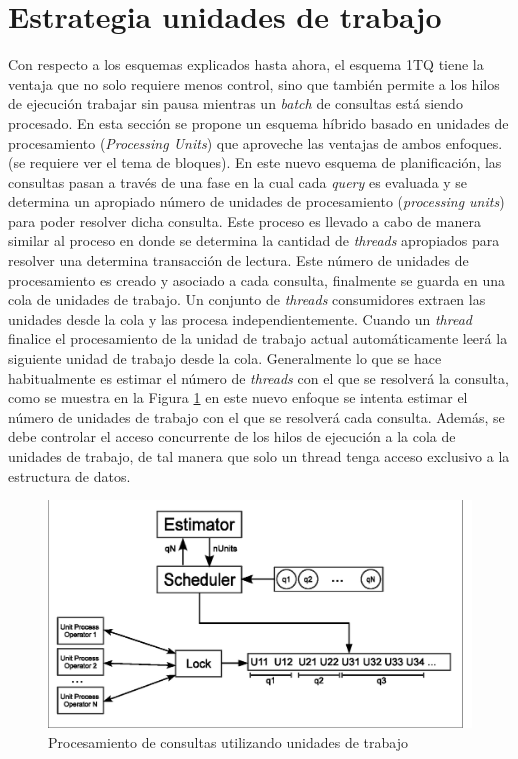 \section{Estrategia unidades de trabajo}
\label{scheduling:unidadestrabajo}
Con respecto a los esquemas explicados hasta ahora, el esquema 1TQ tiene la ventaja que no solo requiere menos control, sino que también permite a los hilos de ejecución trabajar sin pausa mientras un \textit{batch} de consultas está siendo procesado. En esta sección se propone un esquema híbrido basado en unidades de procesamiento (\textit{Processing Units}) que aproveche las ventajas de ambos enfoques. (se requiere ver el tema de bloques).
En este nuevo esquema de planificación, las consultas pasan a través de una fase en la cual cada \textit{query} es evaluada y se determina un apropiado número de unidades de procesamiento (\textit{processing units}) para poder resolver dicha consulta. Este proceso es llevado a cabo de manera similar al proceso en donde se determina la cantidad de \textit{threads} apropiados para resolver una determina transacción de lectura. Este número de unidades de procesamiento es creado y asociado a cada consulta, finalmente se guarda en una cola de unidades de trabajo. Un conjunto de \textit{threads} consumidores extraen las unidades desde la cola y las procesa independientemente. Cuando un \textit{thread} finalice el procesamiento de la unidad de trabajo actual automáticamente leerá la siguiente unidad de trabajo desde la cola. 
Generalmente lo que se hace habitualmente es estimar el número de \textit{threads} con el que se resolverá la consulta, como se muestra en la Figura \ref{fig:unit_process} en este nuevo enfoque se intenta estimar el número de unidades de trabajo con el que se resolverá cada consulta. Además, se debe controlar el acceso concurrente de los hilos de ejecución a la cola de unidades de trabajo, de tal manera que solo un thread tenga acceso exclusivo a la estructura de datos. 

\begin{figure}[!th]
\centering
\includegraphics[scale=.75]{images/unit_process.eps}
\caption{Procesamiento de consultas utilizando unidades de trabajo}
\label{fig:unit_process}
\end{figure}

